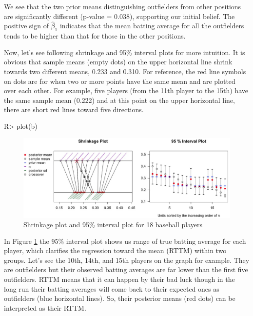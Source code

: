\documentclass[article]{jss}
\begin{document}
We see that the two prior means distinguishing outfielders from other positions are significantly different (p-value = 0.038), supporting our initial belief. The positive sign of $\hat{\beta}_{1}$ indicates that the mean batting average for all the outfielders tends to be higher than that for those in the other positions.

Now, let's see following shrinkage and 95\% interval plots for more intuition. It is obvious that sample means (empty dots) on the upper horizontal line shrink towards two different means, 0.233 and 0.310. For reference, the red line symbols on dots are for when two or more points have the same mean and are plotted over each other. For example, five players (from the 11th player to the 15th) have the same sample mean (0.222) and at this point on the upper horizontal line, there are short red lines toward five directions.

\begin{CodeChunk}
\begin{CodeInput}
R> plot(b)
\end{CodeInput}
\end{CodeChunk}
\begin{figure}[h]
\begin{center}
\includegraphics[scale=0.3]{baseball1.png}
\caption{Shrinkage plot and 95\% interval plot for 18 baseball players}
\label{fig:baseball}
\end{center}
\end{figure}



In Figure \ref{fig:baseball} the 95\% interval plot shows us range of true batting average for each player, which clarifies the regression toward the mean (RTTM) within two groups. Let's see the 10th, 14th, and 15th players on the graph for example. They are outfielders but their observed batting averages are far lower than the first five outfielders. RTTM means that it can happen by their bad luck though in the long run their batting averages will come back to their expected ones as outfielders (blue horizontal lines). So, their posterior means (red dots) can be interpreted as their RTTM. 
\end{document}

